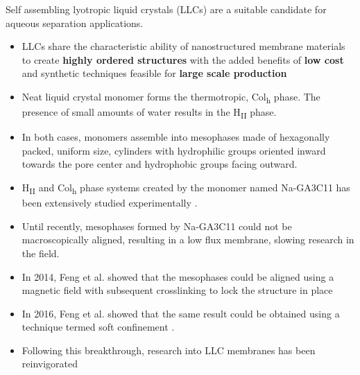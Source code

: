 \documentclass{article}
\begin{document}
  Self assembling lyotropic liquid crystals (LLCs) are a suitable candidate for
  aqueous separation applications. 
  \begin{itemize}
    \item LLCs share the characteristic ability of nanostructured membrane
    materials to create \textbf{highly ordered structures} with the added benefits
    of \textbf{low cost} and synthetic techniques feasible for 
    \textbf{large scale production} \cite{feng_scalable_2014}
    \item Neat liquid crystal monomer forms the thermotropic, Col\textsubscript{h}
    phase. The presence of small amounts of water results in the H\textsubscript{II} 
    phase.
    \item In both cases, monomers assemble into mesophases made of hexagonally
    packed, uniform size, cylinders with hydrophilic groups oriented inward
    towards the pore center and hydrophobic groups facing outward.
    \item H\textsubscript{II} and Col\textsubscript{h} phase systems created by
    the monomer named Na-GA3C11 has been extensively studied experimentally \cite{smith_ordered_1997, %
    zhou_supported_2005,resel_h2-phase_2000,feng_scalable_2014,feng_thin_2016}. 
    \item Until recently, mesophases formed by Na-GA3C11 could not be macroscopically
    aligned, resulting in a low flux membrane, slowing research in the field.
    \item In 2014, Feng et al. showed that the mesophases could be aligned 
    using a magnetic field with subsequent crosslinking to lock the structure
    in place \cite{feng_scalable_2014}
    \item In 2016, Feng et al. showed that the same result could be obtained 
    using a technique termed soft confinement \cite{feng_thin_2016}.
    \item Following this breakthrough, research into LLC membranes has been
    reinvigorated
  \end{itemize}
  
\end{document}
